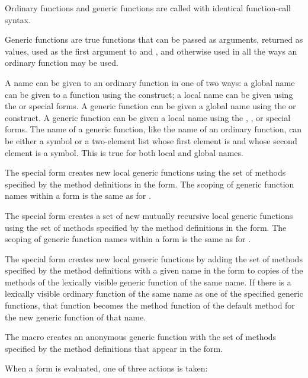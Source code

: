 Ordinary functions and generic functions are called with identical function-call
syntax.
 
Generic functions are true functions that can be passed as arguments, returned as values,
used as the first argument to  and , and otherwise used in all the ways
an ordinary function may be used.

A name can be given to an ordinary function in one of
two ways: a {\bit global\/} name can be given to a function using the
 construct; a {\bit local\/} name can be given using the
 or  special forms.  A generic function can be
given a global name using the  or 
construct.  A generic function can be given a local name using the
, , or 
special forms.  The name of a generic function, like the name of an
ordinary function, can be either a symbol or a two-element list whose
first element is  and whose second element is a symbol.
This is true for both local and global names.

The  special form creates new local generic
functions using the set of methods specified by the method definitions
in the  form.  The scoping of generic function names
within a  form is the same as for .

The  special form creates a set of new mutually
recursive local generic functions using the set of methods specified
by the method definitions in the  form.  The
scoping of generic function names within a  form
is the same as for .

The  special form creates new local generic
functions by adding the set of methods specified by the method
definitions with a given name in the  form to
copies of the methods of the lexically visible generic function of the
same name. If there is a lexically visible ordinary function of the
same name as one of the specified generic functions, that function
becomes the method function of the default method for the new generic
function of that name.

The  macro creates an anonymous generic
function with the set of methods specified by the method definitions that appear
in the  form.

When a  form is evaluated, one of three actions
is taken:

